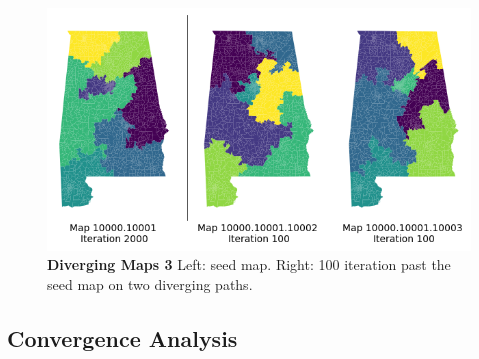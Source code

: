 \documentclass{article}
\begin{document}
\begin{figure}[h]\label{diverge 100}
    \centering
    \includegraphics[scale=.7]{images/maps_100.png}
    \caption{\textbf{Diverging Maps 3} Left: seed map. Right: 100 iteration past the seed map on two diverging paths.}
\end{figure}

\clearpage

\subsection{Convergence Analysis}\label{convergence}
\end{document}
